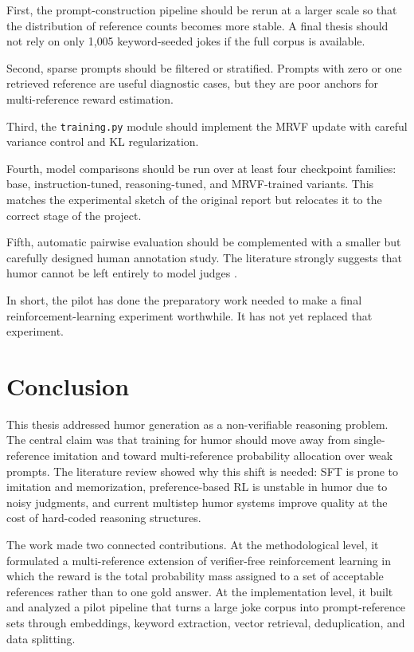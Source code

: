 \documentclass[14pt,a4paper]{extreport}
\begin{document}
First, the prompt-construction pipeline should be rerun at a larger scale so that the distribution of reference counts becomes more stable. A final thesis should not rely on only 1{,}005 keyword-seeded jokes if the full corpus is available.

Second, sparse prompts should be filtered or stratified. Prompts with zero or one retrieved reference are useful diagnostic cases, but they are poor anchors for multi-reference reward estimation.

Third, the \texttt{training.py} module should implement the MRVF update with careful variance control and KL regularization.

Fourth, model comparisons should be run over at least four checkpoint families: base, instruction-tuned, reasoning-tuned, and MRVF-trained variants. This matches the experimental sketch of the original report but relocates it to the correct stage of the project.

Fifth, automatic pairwise evaluation should be complemented with a smaller but carefully designed human annotation study. The literature strongly suggests that humor cannot be left entirely to model judges \citep{Sakabe2025,Zhang2024HumorAI}.

In short, the pilot has done the preparatory work needed to make a final reinforcement-learning experiment worthwhile. It has not yet replaced that experiment.

\chapter*{Conclusion}

This thesis addressed humor generation as a non-verifiable reasoning problem. The central claim was that training for humor should move away from single-reference imitation and toward multi-reference probability allocation over weak prompts. The literature review showed why this shift is needed: SFT is prone to imitation and memorization, preference-based RL is unstable in humor due to noisy judgments, and current multistep humor systems improve quality at the cost of hard-coded reasoning structures.

The work made two connected contributions. At the methodological level, it formulated a multi-reference extension of verifier-free reinforcement learning in which the reward is the total probability mass assigned to a set of acceptable references rather than to one gold answer. At the implementation level, it built and analyzed a pilot pipeline that turns a large joke corpus into prompt-reference sets through embeddings, keyword extraction, vector retrieval, deduplication, and data splitting.
\end{document}
